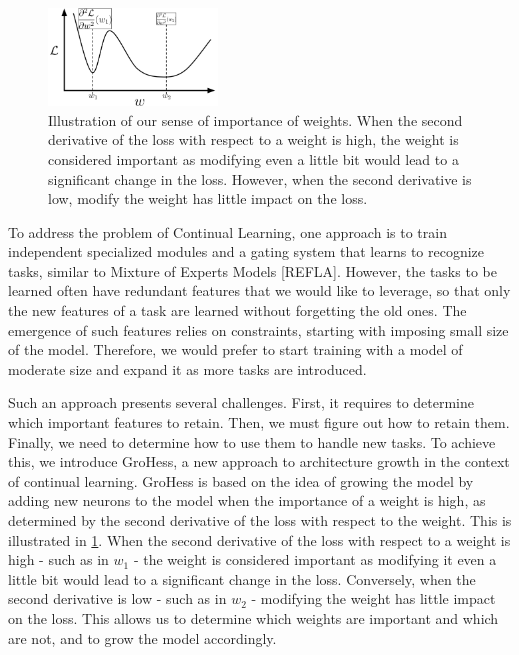 \documentclass[twocolumn]{article}
\begin{document}
\begin{figure}
    \centering
    \includegraphics[width=0.40\textwidth]{images/motivation_GroHess.png}
    \caption{Illustration of our sense of importance of weights. When the second derivative of the loss with respect to a weight is high, the weight is considered important as modifying even a little bit would lead to a significant change in the loss. However, when the second derivative is low, modify the weight has little impact on the loss.}
    \label{fig:motivation_GroHess}
\end{figure}

To address the problem of Continual Learning, one approach is to train independent specialized modules and a gating system that learns to recognize tasks, similar to Mixture of Experts Models [REFLA]. However, the tasks to be learned often have redundant features that we would like to leverage, so that only the new features of a task are learned without forgetting the old ones. The emergence of such features relies on constraints, starting with imposing small size of the model. Therefore, we would prefer to start training with a model of moderate size and expand it as more tasks are introduced.

\vspace{2mm}
\noindent
Such an approach presents several challenges. First, it requires to determine which important features to retain. Then, we must figure out how to retain them. Finally, we need to determine how to use them to handle new tasks. To achieve this, we introduce GroHess, a new approach to architecture growth in the context of continual learning. GroHess is based on the idea of growing the model by adding new neurons to the model when the importance of a weight is high, as determined by the second derivative of the loss with respect to the weight. This is illustrated in \ref{fig:motivation_GroHess}. When the second derivative of the loss with respect to a weight is high - such as in $w_1$ - the weight is considered important as modifying it even a little bit would lead to a significant change in the loss. Conversely, when the second derivative is low - such as in $w_2$ - modifying the weight has little impact on the loss. This allows us to determine which weights are important and which are not, and to grow the model accordingly.
\end{document}
